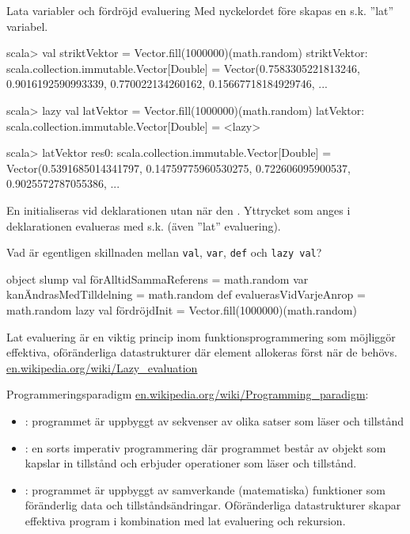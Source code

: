 \begin{Slide}{Lata variabler och fördröjd evaluering} 
Med nyckelordet  före  skapas en s.k. ''lat''  variabel.
\begin{REPL}
scala> val striktVektor = Vector.fill(1000000)(math.random)
striktVektor: scala.collection.immutable.Vector[Double] = 
 Vector(0.7583305221813246, 0.9016192590993339, 0.770022134260162, 0.15667718184929746, ...
 
scala> lazy val latVektor = Vector.fill(1000000)(math.random)
latVektor: scala.collection.immutable.Vector[Double] = <lazy>

scala> latVektor
res0: scala.collection.immutable.Vector[Double] = 
  Vector(0.5391685014341797, 0.14759775960530275, 0.722606095900537, 0.9025572787055386, ... 
\end{REPL}

En  initialiseras  vid deklarationen utan när den . Yttrycket som anges i deklarationen evalueras med s.k.  (även ''lat'' evaluering). 
\end{Slide} 

\begin{Slide}{Vad är egentligen skillnaden mellan \texttt{val}, \texttt{var}, \texttt{def} och \texttt{lazy val}?} 
\begin{Code}[basicstyle=\ttfamily\fontsize{8}{11}\selectfont]
object slump {
  val förAlltidSammaReferens  = math.random
  var kanÄndrasMedTilldelning = math.random
  def evaluerasVidVarjeAnrop  = math.random
  lazy val fördröjdInit       = Vector.fill(1000000)(math.random)
}
\end{Code}
\vspace{1em}\pause
Lat evaluering är en viktig princip inom funktionsprogrammering som möjliggör effektiva, oföränderliga datastrukturer där element allokeras först när de behövs. \\
\href{https://en.wikipedia.org/wiki/Lazy_evaluation}{en.wikipedia.org/wiki/Lazy\_evaluation}
\end{Slide} 



\begin{Slide}{Programmeringsparadigm}
\href{https://en.wikipedia.org/wiki/Programming_paradigm}{en.wikipedia.org/wiki/Programming\_paradigm}:
\begin{itemize}
\item {}: programmet är uppbyggt av sekvenser av olika satser som läser och  tillstånd
\item {}: en sorts imperativ programmering där programmet består av objekt som kapslar in tillstånd och erbjuder operationer som läser och  tillstånd.
\item {}: programmet är uppbyggt av samverkande (matematiska) funktioner som  föränderlig data och tillståndsändringar. Oföränderliga datastrukturer skapar effektiva program i kombination med lat evaluering och rekursion. 
\end{itemize}
\end{Slide} 


